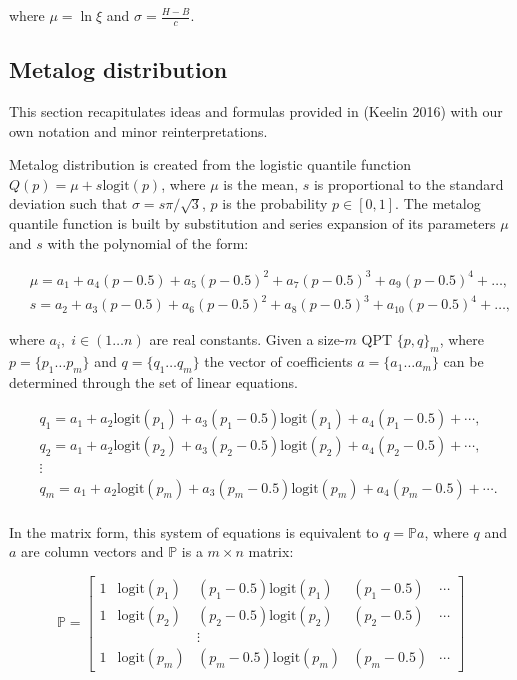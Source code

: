 \documentclass[
]{interact}
\begin{document}
where \(\mu=\ln\xi\) and \(\sigma=\frac{H-B}{c}\).

\subsection*{Metalog distribution}\label{metalog-distribution}

This section recapitulates ideas and formulas provided in (Keelin 2016)
with our own notation and minor reinterpretations.

Metalog distribution is created from the logistic quantile function
\(Q(p)=\mu+s\text{logit}(p)\), where \(\mu\) is the mean, \(s\) is
proportional to the standard deviation such that \(\sigma=s\pi/\sqrt3\),
\(p\) is the probability \(p \in [0,1]\). The metalog quantile function
is built by substitution and series expansion of its parameters \(\mu\)
and \(s\) with the polynomial of the form:

\[
\begin{aligned}\;
&\mu=a_1+a_4(p-0.5)+a_5(p-0.5)^2+a_7(p-0.5)^3+a_9(p-0.5)^4+\dots, \\
& s=a_2+a_3(p-0.5)+a_6(p-0.5)^2+a_8(p-0.5)^3+a_{10}(p-0.5)^4+\dots,
\end{aligned}
\]

where \(a_i, \; i \in (1\dots n)\) are real constants. Given a
size-\(m\) QPT \(\{p, q\}_m\), where \(p=\{p_1\dots p_m\}\) and
\(q=\{q_1\dots q_m\}\) the vector of coefficients \(a=\{a_1\dots a_m\}\)
can be determined through the set of linear equations.

\[
\begin{aligned}\;
&q_1=a_1+a_2\text{logit}(p_1)+a_3(p_1-0.5)\text{logit}(p_1)+a_4(p_1-0.5)+\cdots,\\
&q_2=a_1+a_2\text{logit}(p_2)+a_3(p_2-0.5)\text{logit}(p_2)+a_4(p_2-0.5)+\cdots,\\
&\vdots\\
&q_m=a_1+a_2\text{logit}(p_m)+a_3(p_m-0.5)\text{logit}(p_m)+a_4(p_m-0.5)+\cdots.\\
\end{aligned}
\]

In the matrix form, this system of equations is equivalent to
\(q=\mathbb{P}a\), where \(q\) and \(a\) are column vectors and
\(\mathbb{P}\) is a \(m \times n\) matrix:

\[
\mathbb{P} = \left[\begin{array}{lllll}
1  &\text{logit}(p_1) &(p_1-0.5)\text{logit}(p_1) &(p_1-0.5) &\cdots\\
1  &\text{logit}(p_2) &(p_2-0.5)\text{logit}(p_2) &(p_2-0.5) &\cdots\\
   &                  &\vdots\\
1  &\text{logit}(p_m) &(p_m-0.5)\text{logit}(p_m) &(p_m-0.5) &\cdots
\end{array}\right]
\]
\end{document}
